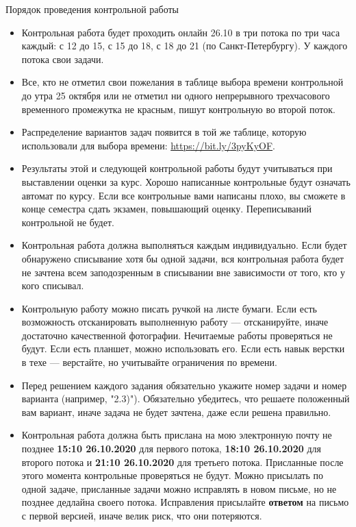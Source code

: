 \documentclass[12pt]{article}
\begin{document}
\begin{center}
  \LARGE Порядок проведения контрольной работы
\end{center}

\begin{itemize}
  \item Контрольная работа  будет проходить онлайн 26.10 в три потока по три часа каждый: с 12 до 15, с 15 до 18, с 18 до 21 (по Санкт-Петербургу). У каждого потока свои задачи.
  \item Все, кто не отметил свои пожелания в таблице выбора времени контрольной до утра 25 октября или не отметил ни одного непрерывного трехчасового временного промежутка не красным, пишут контрольную во второй поток.
  \item Распределение вариантов задач появится в той же таблице, которую использовали для выбора времени: \url{https://bit.ly/3pyKyOF}.
  \item Результаты этой и следующей контрольной работы будут учитываться при выставлении оценки за курс. Хорошо написанные контрольные будут означать автомат по курсу. Если все контрольные вами написаны плохо, вы сможете в конце семестра сдать экзамен, повышающий оценку. Переписываний контрольной не будет.
  \item Контрольная работа должна выполняться каждым индивидуально. Если будет обнаружено списывание хотя бы одной задачи, вся контрольная работа будет не зачтена всем заподозренным в списывании вне зависимости от того, кто у кого списывал.
  \item Контрольную работу можно писать ручкой на листе бумаги. Если есть возможность отсканировать выполненную работу --- отсканируйте, иначе достаточно качественной фотографии. Нечитаемые работы проверяться не будут. Если есть планшет, можно использовать его. Если есть навык верстки в техе --- верстайте, но учитывайте ограничения по времени.
  \item Перед решением каждого задания обязательно укажите номер задачи и номер варианта (например, "2.3)"). Обязательно убедитесь, что решаете положенный вам вариант, иначе задача не будет зачтена, даже если решена правильно.
  \item Контрольная работа должна быть прислана на мою электронную почту не позднее \textbf{15:10 26.10.2020} для первого потока, \textbf{18:10 26.10.2020} для второго потока и \textbf{21:10 26.10.2020} для третьего потока. Присланные после этого момента контрольные проверяться не будут. Можно присылать по одной задаче, присланные задачи можно исправлять в новом письме, но не позднее дедлайна своего потока. Исправления присылайте \textbf{ответом} на письмо с первой версией, иначе велик риск, что они потеряются.

\end{itemize}
\end{document}
